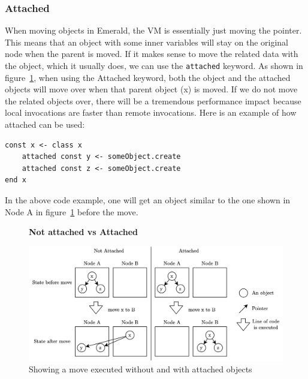 \subsubsection{Attached}
When moving objects in Emerald, the VM is essentially just moving the pointer. This means that an object with some inner variables will stay on the original node when the parent is moved. If it makes sense to move the related data with the object, which it usually does, we can use the \verb|attached| keyword.
As shown in figure~\ref{fig:emerald_attached_figure}, when using the Attached keyword, both the object and the attached objects will move over when that parent object (x) is moved. If we do not move the related objects over, there will be a tremendous performance impact because local invocations are faster than remote invocations. Here is an example of how attached can be used:
\begin{lstlisting}[language=emerald]
const x <- class x
    attached const y <- someObject.create
    attached const z <- someObject.create
end x
\end{lstlisting}
In the above code example, one will get an object similar to the one shown in Node A in figure~\ref{fig:emerald_attached_figure} before the move.

\begin{figure}[t]
    \centering
    \textbf{Not attached vs Attached}\par\medskip
    \includegraphics[scale=0.8]{chapters/2_background/figures/emerald_attached.png}
    \caption{Showing a move executed without and with attached objects}
    \label{fig:emerald_attached_figure}
\end{figure}



